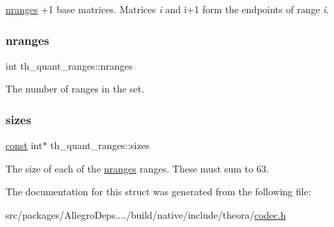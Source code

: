\hyperlink{structth__quant__ranges_a53e5a3d7f7a112100b4b670929b3ebab}{nranges} {\ttfamily +1} base matrices. Matrices {\itshape i} and {\ttfamily i+1} form the endpoints of range {\itshape i}. \mbox{\label{structth__quant__ranges_a53e5a3d7f7a112100b4b670929b3ebab}} 
\subsubsection{\texorpdfstring{nranges}{nranges}}
{\footnotesize\ttfamily int th\+\_\+quant\+\_\+ranges\+::nranges}

The number of ranges in the set. \mbox{\label{structth__quant__ranges_af3188a373bc0b8ffaa330d0ab4c1a194}} 
\subsubsection{\texorpdfstring{sizes}{sizes}}
{\footnotesize\ttfamily \hyperlink{zconf_8h_a2c212835823e3c54a8ab6d95c652660e}{const} int$\ast$ th\+\_\+quant\+\_\+ranges\+::sizes}

The size of each of the \hyperlink{structth__quant__ranges_a53e5a3d7f7a112100b4b670929b3ebab}{nranges} ranges. These must sum to 63. 

The documentation for this struct was generated from the following file\+:\begin{DoxyCompactItemize}
\item 
src/packages/\+Allegro\+Deps..../build/native/include/theora/\hyperlink{theora_2codec_8h}{codec.\+h}\end{DoxyCompactItemize}
